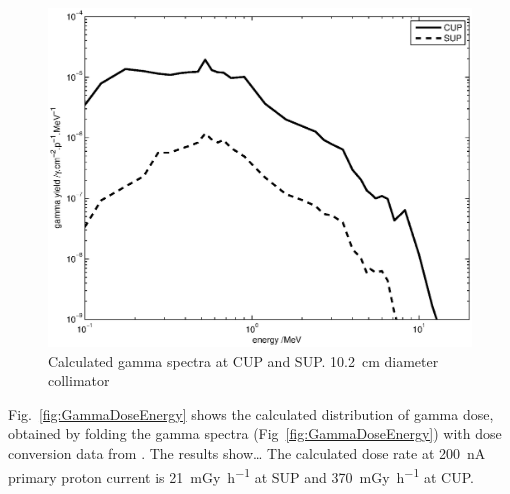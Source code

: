 \documentclass[11pt,a4paper]{IEEEtran}
\let\MYoriglatexcaption\caption
\renewcommand{\caption}[2][\relax]{\MYoriglatexcaption[#2]{#2}}
\begin{document}
\begin{figure}[t]
    \centering
    \includegraphics[width=0.9\columnwidth]{gDYieldcomparedRADECS.eps}
    \caption{
        Calculated gamma spectra at CUP and SUP.
        \SI{10.2}{\cm} diameter collimator
    }
    \label{fig:DifferentialGammaSpectra}
\end{figure}

Fig.~\ref{fig:GammaDoseEnergy} shows the calculated distribution of gamma dose, obtained by folding the gamma spectra (Fig~\ref{fig:GammaDoseEnergy}) with dose conversion data from \cite{tbd}.
The results show\ldots
{}
The calculated dose rate at \SI{200}{\nA} primary proton current is \SI{21}{\milli\gray\per\hour} at SUP and \SI{370}{\milli\gray\per\hour} at CUP.
\end{document}
